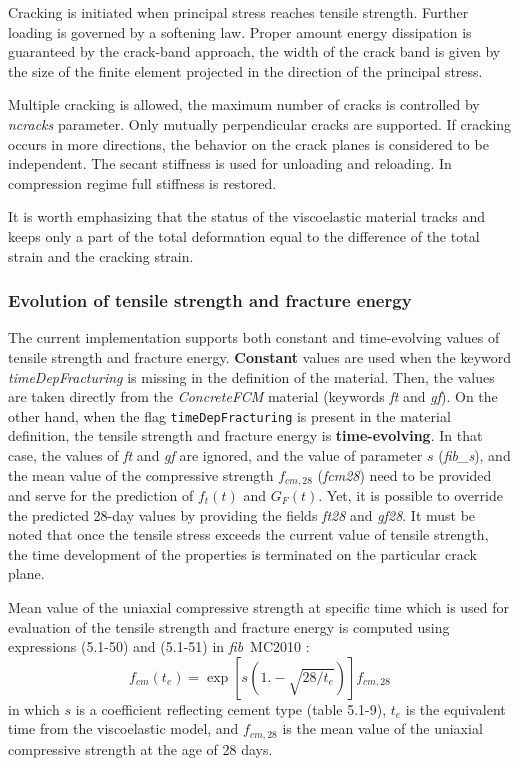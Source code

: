 \documentclass[a4paper]{article}
\newcommand{\param}[1]{{\it #1}}
\begin{document}
Cracking is initiated when principal stress reaches tensile
strength. Further loading is governed by a softening law. Proper
amount energy dissipation is guaranteed by the crack-band approach,
the width of the crack band is given by the size of the finite element
projected in the direction of the principal stress.

Multiple cracking is allowed, the maximum number of cracks is controlled by \param{ncracks} parameter. Only mutually perpendicular cracks are supported. If cracking occurs in more directions, the behavior on the crack planes is considered to be independent.
The secant stiffness is used for unloading and reloading. In
compression regime full stiffness is restored.

It is worth emphasizing that the status of the viscoelastic material
tracks and keeps only a part of the total deformation equal to the
difference of the total strain and the cracking strain.


\subsubsection*{Evolution of tensile strength and fracture energy}

The current implementation supports both constant and time-evolving
values of tensile strength and fracture energy.
\textbf{Constant} values are used when the keyword \param{timeDepFracturing}
is missing in the definition of the material. Then, the values are taken directly from the
\emph{ConcreteFCM} material (keywords \param{ft} and \param{gf}).
On the other hand, when the flag \texttt{timeDepFracturing} is present
in the material definition, the tensile strength and fracture energy
is \textbf{time-evolving}. In that case, the values of \param{ft} and \param{gf}
are ignored, and the value of parameter $s$ (\param{fib\_s}), and the mean
value of the compressive strength $f_{cm,28}$ (\param{fcm28}) need to be
provided and serve for the prediction of $f_t(t)$ and $G_F(t)$.
Yet, it is possible to
override the predicted 28-day values by providing the fields
\param{ft28} and \param{gf28}.
%
It must be noted that once the tensile stress exceeds the current
value of tensile strength, the time development of the properties is
terminated on the particular crack plane.

Mean value of the uniaxial compressive strength at specific time which
is used for evaluation of the tensile strength and fracture energy is
computed using expressions (5.1-50) and (5.1-51) in \emph{fib}~MC2010 \cite{fib:2010}:
\begin{equation}  
f_{cm}(t_e) = \exp \left[ s \left( 1. - \sqrt{28/t_e} \right)   \right] f_{cm,28}
\end{equation}
in which $s$ is a coefficient reflecting cement type (table
5.1-9), $t_e$ is the equivalent time from the viscoelastic model, and
$f_{cm,28}$ is the mean value of the uniaxial compressive strength at
the age of 28 days.
\end{document}
